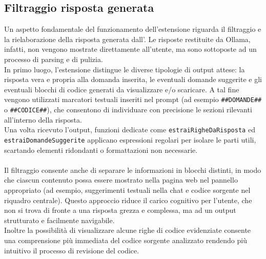\subsection{Filtraggio risposta generata}
\noindent Un aspetto fondamentale del funzionamento dell'estensione riguarda il filtraggio e la rielaborazione della risposta generata dall’. Le risposte restituite da Ollama, infatti, non vengono mostrate direttamente all’utente, ma sono sottoposte ad un processo di parsing e di pulizia.\\
In primo luogo, l’estensione distingue le diverse tipologie di output attese: la risposta vera e propria alla domanda inserita, le eventuali domande suggerite e gli eventuali blocchi di codice generati da visualizzare e/o scaricare. A tal fine vengono utilizzati marcatori testuali inseriti nel prompt (ad esempio \texttt{\#\#DOMANDE\#\#} o \texttt{\#\#CODICE\#\#}), che consentono di individuare con precisione le sezioni rilevanti all’interno della risposta. \\Una volta ricevuto l’output, funzioni dedicate come \texttt{estraiRigheDaRisposta} ed \\ \texttt{estraiDomandeSuggerite} applicano espressioni regolari per isolare le parti utili, scartando elementi ridondanti o formattazioni non necessarie.\\
\\
Il filtraggio consente anche di separare le informazioni in blocchi distinti, in modo che ciascun contenuto possa essere mostrato nella pagina web nel pannello appropriato (ad esempio, suggerimenti testuali nella chat e codice sorgente nel riquadro centrale). Questo approccio riduce il carico cognitivo per l’utente, che non si trova di fronte a una risposta grezza e complessa, ma ad un output strutturato e facilmente navigabile.\\ Inoltre la possibilità di visualizzare alcune righe di codice evidenziate consente una comprensione più immediata del codice sorgente analizzato rendendo più intuitivo il processo di revisione del codice.


